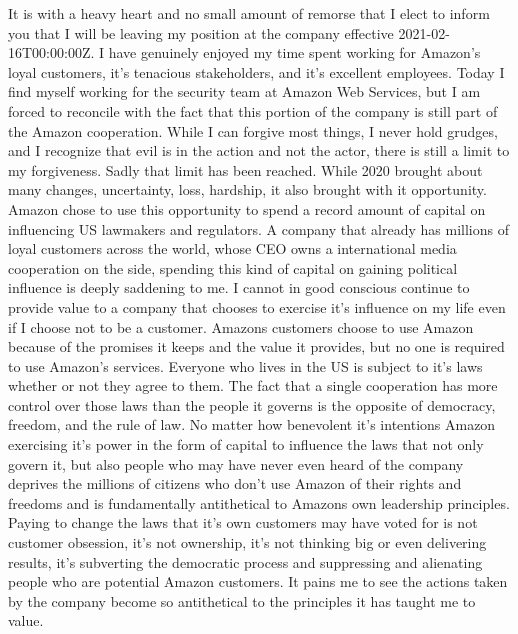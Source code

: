 \documentclass[12pt,stdletter,orderfromtodate,sigleft]{newlfm}
\begin{document}
\begin{newlfm}
It is with a heavy heart and no small amount of remorse that I elect to inform you that I will be leaving my position at the company effective 2021-02-16T00:00:00Z. I have genuinely enjoyed my time spent working for Amazon's loyal customers, it's tenacious stakeholders, and it's excellent employees. Today I find myself working for the security team at Amazon Web Services, but I am forced to reconcile with the fact that this portion of the company is still part of the Amazon cooperation. While I can forgive most things, I never hold grudges, and I recognize that evil is in the action and not the actor, there is still a limit to my forgiveness. Sadly that limit has been reached. While 2020 brought about many changes, uncertainty, loss, hardship, it also brought with it opportunity. Amazon chose to use this opportunity to spend a record amount of capital on influencing US lawmakers and regulators. A company that already has millions of loyal customers across the world, whose CEO owns a international media cooperation on the side, spending this kind of capital on gaining political influence is deeply saddening to me. I cannot in good conscious continue to provide value to a company that chooses to exercise it's influence on my life even if I choose not to be a customer. Amazons customers choose to use Amazon because of the promises it keeps and the value it provides, but no one is required to use Amazon's services. Everyone who lives in the US is subject to it's laws whether or not they agree to them. The fact that a single cooperation has more control over those laws than the people it governs is the opposite of democracy, freedom, and the rule of law. No matter how benevolent it's intentions Amazon exercising it's power in the form of capital to influence the laws that not only govern it, but also people who may have never even heard of the company deprives the millions of citizens who don't use Amazon of their rights and freedoms and is fundamentally antithetical to Amazons own leadership principles. Paying to change the laws that it's own customers may have voted for is not customer obsession, it's not ownership, it's not thinking big or even delivering results, it's subverting the democratic process and suppressing and alienating people who are potential Amazon customers. It pains me to see the actions taken by the company become so antithetical to the principles it has taught me to value.
\end{newlfm}
\end{document}
